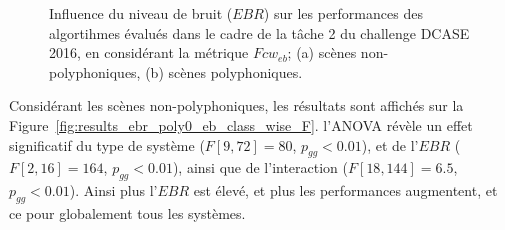 \begin{figure}[t]
        \myfloatalign
        \par
        \par
       \caption[Influence du niveau de bruit ($EBR$) sur les performances des algortihmes évalués dans le cadre de la tâche 2 du challenge DCASE 2016, en considérant la métrique $Fcw_{eb}$]{Influence du niveau de bruit ($EBR$) sur les performances des algortihmes évalués dans le cadre de la tâche 2 du challenge DCASE 2016, en considérant la métrique $Fcw_{eb}$; (a) scènes non-polyphoniques, (b) scènes polyphoniques.}\label{fig:dcase2016_poly1_eb_fc}
\end{figure}

Considérant les scènes non-polyphoniques, les résultats sont affichés sur la Figure~\ref{fig:results_ebr_poly0_eb_class_wise_F}. l'ANOVA révèle un effet significatif du type de système ($F[9,72]=80$, $p_{gg}<0.01$), et de l'$EBR$ ($F[2,16]=164$, $p_{gg}<0.01$), ainsi que de l'interaction ($F[18,144]=6.5$, $p_{gg}<0.01$). Ainsi plus l'$EBR$ est élevé, et plus les performances augmentent, et ce pour globalement tous les systèmes.

